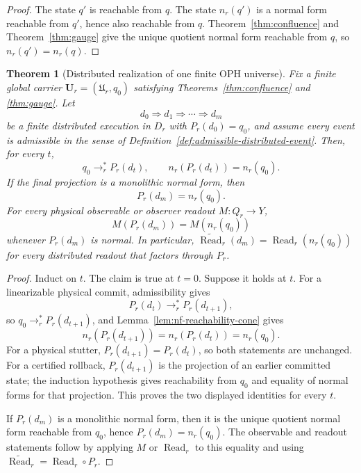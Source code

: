 \documentclass[11pt]{article}
\newtheorem{theorem}{Theorem}[section]
\theoremstyle{remark}
\theoremstyle{plain}
\begin{document}
\begin{proof}
The state \(q'\) is reachable from \(q\). The state \(n_r(q')\) is a normal form reachable from
\(q'\), hence also reachable from \(q\). Theorem~\ref{thm:confluence} and
Theorem~\ref{thm:gauge} give the unique quotient normal form reachable from \(q\), so
\(n_r(q')=n_r(q)\).
\end{proof}

\begin{theorem}[Distributed realization of one finite OPH universe]\label{thm:distributed-one-universe}
Fix a finite global carrier \(\mathbf U_r=(\mathfrak U_r,q_0)\) satisfying
Theorems~\ref{thm:confluence} and \ref{thm:gauge}. Let
\[
d_0\Rightarrow d_1\Rightarrow\cdots\Rightarrow d_m
\]
be a finite distributed execution in \(D_r\) with \(P_r(d_0)=q_0\), and assume every event is
admissible in the sense of Definition~\ref{def:admissible-distributed-event}. Then, for every
\(t\),
\[
q_0\to_r^*P_r(d_t),
\qquad
n_r(P_r(d_t))=n_r(q_0).
\]
If the final projection is a monolithic normal form, then
\[
P_r(d_m)=n_r(q_0).
\]
For every physical observable or observer readout \(M:Q_r\to Y\),
\[
M(P_r(d_m))=M(n_r(q_0))
\]
whenever \(P_r(d_m)\) is normal. In particular,
\(\widetilde{\operatorname{Read}}_r(d_m)=\operatorname{Read}_r(n_r(q_0))\) for every
distributed readout that factors through \(P_r\).
\end{theorem}

\begin{proof}
Induct on \(t\). The claim is true at \(t=0\). Suppose it holds at \(t\). For a linearizable
physical commit, admissibility gives
\[
P_r(d_t)\to_r^*P_r(d_{t+1}),
\]
so \(q_0\to_r^*P_r(d_{t+1})\), and Lemma~\ref{lem:nf-reachability-cone} gives
\[
n_r(P_r(d_{t+1}))=n_r(P_r(d_t))=n_r(q_0).
\]
For a physical stutter, \(P_r(d_{t+1})=P_r(d_t)\), so both statements are unchanged. For a
certified rollback, \(P_r(d_{t+1})\) is the projection of an earlier committed state; the
induction hypothesis gives reachability from \(q_0\) and equality of normal forms for
that projection. This proves the two displayed identities for every \(t\).

If \(P_r(d_m)\) is a monolithic normal form, then it is the unique quotient normal form reachable
from \(q_0\), hence \(P_r(d_m)=n_r(q_0)\). The observable and readout statements follow by applying
\(M\) or \(\operatorname{Read}_r\) to this equality and using
\(\widetilde{\operatorname{Read}}_r=\operatorname{Read}_r\circ P_r\).
\end{proof}
\end{document}
